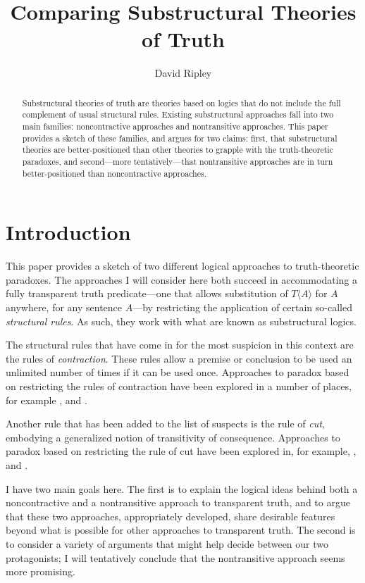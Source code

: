 \documentclass{ergoclass}
\title{Comparing Substructural Theories of Truth}
\author{David Ripley}
\affiliation{University of Connecticut}
\newcommand{\Tname}[1]{\T\name{#1}}
\newcommand{\name}[1]{\ensuremath{\langle #1 \rangle}}
\newcommand{\T}{\ensuremath{T}}
\renewcommand{\cite}{\citet}						%
\begin{document}
\maketitle

\begin{abstract}
Substructural theories of truth are theories based on logics that do not include the full
complement of usual structural rules. Existing substructural approaches fall into two
main families: noncontractive approaches and nontransitive approaches. This paper
provides a sketch of these families, and argues for two claims: first, that substructural
theories are better-positioned
than other theories to grapple with the truth-theoretic
paradoxes, and second---more
tentatively---that
nontransitive approaches are in turn
better-positioned
than noncontractive approaches.
\end{abstract}

\section{Introduction}

This paper provides a sketch of two different logical approaches to truth-theoretic paradoxes. The approaches I will consider here both succeed in accommodating a fully transparent truth predicate---one that allows substitution of $\Tname{A}$ for $A$ anywhere, for any sentence $A$---by restricting the application of certain so-called {\em structural rules}. As such, they work with what are known as substructural logics.

The structural rules that have come in for the most suspicion in this context are the rules of {\em contraction}. These rules allow a premise or conclusion to be used an unlimited number of times if it can be used once. Approaches to paradox based on restricting the rules of contraction have been explored in a number of places, for example \cite{bm:2curry, grishin:pstclwc, petersen:lwciua, restall:lwc, shapiro:dlc}, and \cite{zardini:twc}.

Another rule that has been added to the list of suspects is the rule of {\em cut}, embodying a generalized notion of transitivity of consequence. Approaches to paradox based on restricting the rule of cut have been explored in, for example, \citet*{cervr:rtt, ripley:pafc}, and \cite{weir:ntsl}.

I have two main goals here. The first is to explain the logical ideas behind both a noncontractive and a nontransitive approach to transparent truth, and to argue that these two approaches, appropriately developed, share desirable features beyond what is possible for other approaches to transparent truth. The second is to consider a variety of arguments that might help decide between our two protagonists; I will tentatively conclude that the nontransitive approach seems more promising.
\end{document}
